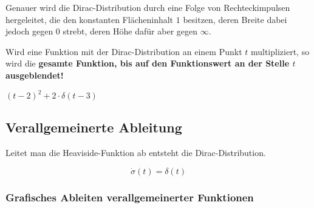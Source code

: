 \documentclass[12pt, a4paper]{scrartcl}
\begin{document}
Genauer wird die Dirac-Distribution durch eine Folge von Rechteckimpulsen hergeleitet, die den konstanten Flächeninhalt \(1\) besitzen, deren Breite dabei jedoch gegen \(0\) strebt, deren Höhe dafür aber gegen \(\infty\).

\begin{minipage}{.5\textwidth}
  Wird eine Funktion mit der Dirac-Distribution an einem Punkt \(t\) multipliziert, so wird die \textbf{gesamte Funktion, bis auf den Funktionswert an der Stelle \(t\) ausgeblendet!}
\end{minipage}\hfill%
\begin{minipage}{.5\textwidth}
  \centering
  {\footnotesize \((t-2)^2+2 \cdot \delta(t-3)\)}
\end{minipage}

\subsection{Verallgemeinerte Ableitung}

Leitet man die Heaviside-Funktion ab entsteht die Dirac-Distribution.

\begin{framed}
  \[
    \dot{\sigma} (t) = \delta (t)
  \]
\end{framed}

\subsubsection{Grafisches Ableiten verallgemeinerter Funktionen}
\end{document}
